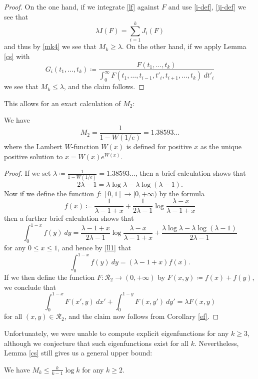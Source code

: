 \begin{proof}  On the one hand, if we integrate \eqref{lf} against $F$ and use \eqref{i-def}, \eqref{ji-def} we see that
$$ \lambda I(F) = \sum_{i=1}^k J_i(F)$$
and thus by \eqref{mk4} we see that $M_k \geq \lambda$.  On the other hand, if we apply Lemma \ref{cs} with
$$ G_i(t_1,\dots,t_k) \coloneqq \frac{F(t_1,\dots,t_k)}{\int_0^\infty F(t_1,\dots,t_{i-1},t'_i, t_{i+1},\dots,t_k)\ dt'_i}$$
we see that $M_k \leq \lambda$, and the claim follows.
\end{proof}

This allows for an exact calculation of $M_2$:

\begin{corollary}[Computation of $M_2$]\label{m2-comp}
We have 
$$M_2 = \frac{1}{1 - W(1/e)} = 1.38593\dots$$
where the Lambert $W$-function $W(x)$ is defined for positive $x$ as the unique positive solution to $x = W(x) e^{W(x)}$.
\end{corollary}

\begin{proof}  If we set $\lambda \coloneqq \frac{1}{1-W(1/e)} = 1.38593\dots$, then a brief calculation shows that
\begin{equation}\label{ll1}
 2\lambda - 1 = \lambda \log \lambda - \lambda \log(\lambda-1).
\end{equation}
Now if we define the function $f: [0,1] \to [0,+\infty)$ by the formula
$$ f(x) \coloneqq \frac{1}{\lambda-1+x} + \frac{1}{2\lambda-1} \log \frac{\lambda-x}{\lambda-1+x}$$
then a further brief calculation shows that
$$ \int_0^{1-x} f(y)\ dy = \frac{\lambda-1+x}{2\lambda-1} \log \frac{\lambda-x}{\lambda-1+x} + \frac{\lambda \log \lambda - \lambda \log(\lambda-1)}{2\lambda-1}$$
for any $0 \leq x \leq 1$, and hence by \eqref{ll1} that
$$ \int_0^{1-x} f(y)\ dy = (\lambda-1+x) f(x).$$
If we then define the function $F: {\mathcal R}_2 \to (0,+\infty)$ by $F(x,y) \coloneqq f(x) + f(y)$, we conclude that
$$ \int_0^{1-x} F(x',y)\ dx' + \int_0^{1-y} F(x,y')\ dy' = \lambda F(x,y)$$
for all $(x,y) \in {\mathcal R}_2$, and the claim now follows from Corollary \ref{ef}.
\end{proof}

Unfortunately, we were unable to compute explicit eigenfunctions for any $k \geq 3$, although we conjecture that such eigenfunctions exist for all $k$.  Nevertheless, Lemma \ref{cs} still gives us a general upper bound:

\begin{corollary}\label{mk-upper}  We have $M_k \leq \frac{k}{k-1} \log k$ for any $k \geq 2$.
\end{corollary}

